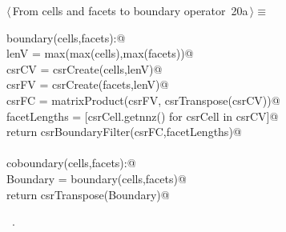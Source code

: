 \documentclass[11pt,oneside]{article}	%
\begin{document}
\begin{flushleft} \small \label{scrap35}
\protect{}$\langle\,$From cells and facets to boundary operator\nobreak\ {\footnotesize 20a}$\,\rangle\equiv$
\vspace{-1ex}
\begin{list}{}{} \item
\mbox{}\verb@def boundary(cells,facets):@\\
\mbox{}\verb@    lenV = max(max(cells),max(facets))@\\
\mbox{}\verb@    csrCV = csrCreate(cells,lenV)@\\
\mbox{}\verb@    csrFV = csrCreate(facets,lenV)@\\
\mbox{}\verb@    csrFC = matrixProduct(csrFV, csrTranspose(csrCV))@\\
\mbox{}\verb@    facetLengths = [csrCell.getnnz() for csrCell in csrCV]@\\
\mbox{}\verb@    return csrBoundaryFilter(csrFC,facetLengths)@\\
\mbox{}\verb@@\\
\mbox{}\verb@def coboundary(cells,facets):@\\
\mbox{}\verb@    Boundary = boundary(cells,facets)@\\
\mbox{}\verb@    return csrTranspose(Boundary)@\\
\mbox{}\verb@@{\NWsep}
\end{list}
\vspace{-1ex}
\footnotesize\addtolength{\baselineskip}{-1ex}
\begin{list}{}{\setlength{\itemsep}{-\parsep}\setlength{\itemindent}{-\leftmargin}}
\item \NWtxtMacroRefIn\ .
\end{list}
\end{flushleft}
\end{document}
